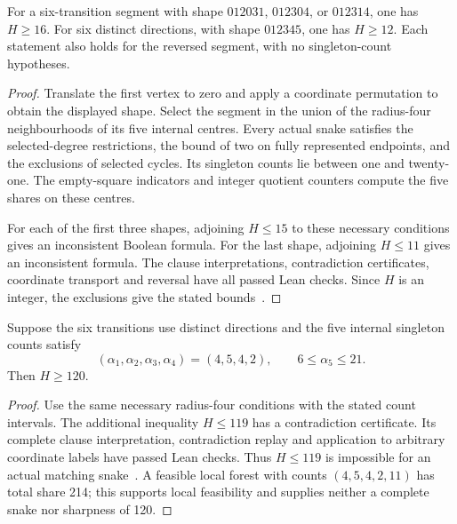 \begin{theorem}\label{thm:countfree-completed}
For a six-transition segment with shape $012031$, $012304$, or $012314$, one has $H\ge16$. For six distinct directions, with shape $012345$, one has $H\ge12$. Each statement also holds for the reversed segment, with no singleton-count hypotheses.
\end{theorem}
\begin{proof}
Translate the first vertex to zero and apply a coordinate permutation to obtain the displayed shape. Select the segment in the union of the radius-four neighbourhoods of its five internal centres. Every actual snake satisfies the selected-degree restrictions, the bound of two on fully represented endpoints, and the exclusions of selected cycles. Its singleton counts lie between one and twenty-one. The empty-square indicators and integer quotient counters compute the five shares on these centres.

For each of the first three shapes, adjoining $H\le15$ to these necessary conditions gives an inconsistent Boolean formula. For the last shape, adjoining $H\le11$ gives an inconsistent formula. The clause interpretations, contradiction certificates, coordinate transport and reversal have all passed Lean checks. Since $H$ is an integer, the exclusions give the stated bounds~\cite{countfreearchive}.
\end{proof}

\begin{theorem}\label{thm:share120}
Suppose the six transitions use distinct directions and the five internal singleton counts satisfy
\[
(\alpha_1,\alpha_2,\alpha_3,\alpha_4)=(4,5,4,2),
\qquad 6\le\alpha_5\le21.
\]
Then $H\ge120$.
\end{theorem}
\begin{proof}
Use the same necessary radius-four conditions with the stated count intervals. The additional inequality $H\le119$ has a contradiction certificate. Its complete clause interpretation, contradiction replay and application to arbitrary coordinate labels have passed Lean checks. Thus $H\le119$ is impossible for an actual matching snake~\cite{countfreearchive}. A feasible local forest with counts $(4,5,4,2,11)$ has total share 214; this supports local feasibility and supplies neither a complete snake nor sharpness of 120.
\end{proof}

